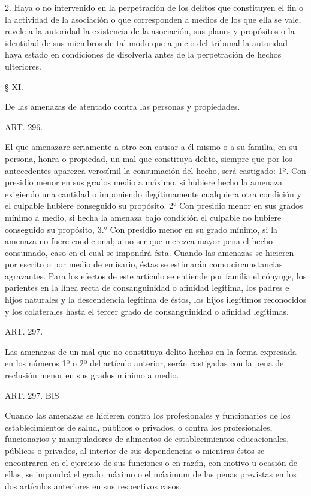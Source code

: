     2. Haya o no intervenido en la perpetración de los delitos que constituyen el fin o la actividad de la asociación o que corresponden a medios de los que ella se vale, revele a la autoridad la existencia de la asociación, sus planes y propósitos o la identidad de sus miembros de tal modo que a juicio del tribunal la autoridad haya estado en condiciones de disolverla antes de la perpetración de hechos ulteriores.



    § XI.

    De las amenazas de atentado contra las personas y propiedades.





    ART. 296.

    El que amenazare seriamente a otro con causar a él mismo o a su familia, en su persona, honra o propiedad, un mal que constituya delito, siempre que por los antecedentes aparezca verosímil la consumación del hecho, será castigado:
    1º. Con presidio menor en sus grados medio a máximo, si hubiere hecho la amenaza exigiendo una cantidad o imponiendo ilegítimamente cualquiera otra condición y el culpable hubiere conseguido su propósito.
    2° Con presidio menor en sus grados mínimo a medio, si hecha la amenaza bajo condición el culpable no hubiere conseguido su propósito,
    3.° Con presidio menor en su grado mínimo, si la amenaza no fuere condicional; a no ser que merezca mayor pena el hecho consumado, caso en el cual se impondrá ésta.
    Cuando las amenazas se hicieren por escrito o por medio de emisario, éstas se estimarán como circunstancias agravantes.
    Para los efectos de este artículo se entiende por familia el cónyuge, los parientes en la línea recta de consanguinidad o afinidad legítima, los padres e hijos naturales y la descendencia legítima de éstos, los hijos ilegítimos reconocidos y los colaterales hasta el tercer grado de consanguinidad o afinidad legítimas.



    ART. 297.

    Las amenazas de un mal que no constituya delito hechas en la forma expresada en los números 1º o 2º del artículo anterior, serán castigadas con la pena de reclusión menor en sus grados mínimo a medio.



    ART. 297. BIS

    Cuando las amenazas se hicieren contra los profesionales y funcionarios de los establecimientos de salud, públicos o privados, o contra los profesionales, funcionarios y manipuladores de alimentos de establecimientos educacionales, públicos o privados, al interior de sus dependencias o mientras éstos se encontraren en el ejercicio de sus funciones o en razón, con motivo u ocasión de ellas, se impondrá el grado máximo o el máximum de las penas previstas en los dos artículos anteriores en sus respectivos casos.


